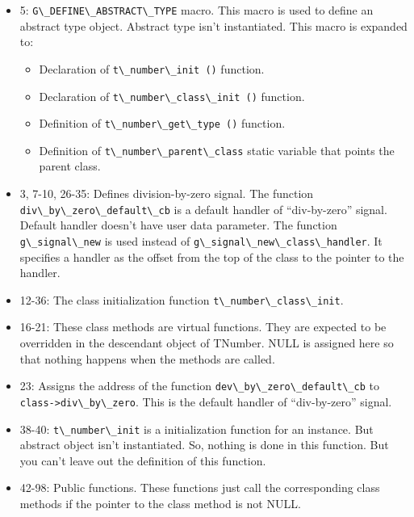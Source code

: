 \begin{itemize}
\tightlist
\item
  5: \passthrough{\lstinline!G\_DEFINE\_ABSTRACT\_TYPE!} macro. This
  macro is used to define an abstract type object. Abstract type isn't
  instantiated. This macro is expanded to:

  \begin{itemize}
  \tightlist
  \item
    Declaration of \passthrough{\lstinline!t\_number\_init ()!}
    function.
  \item
    Declaration of \passthrough{\lstinline!t\_number\_class\_init ()!}
    function.
  \item
    Definition of \passthrough{\lstinline!t\_number\_get\_type ()!}
    function.
  \item
    Definition of \passthrough{\lstinline!t\_number\_parent\_class!}
    static variable that points the parent class.
  \end{itemize}
\item
  3, 7-10, 26-35: Defines division-by-zero signal. The function
  \passthrough{\lstinline!div\_by\_zero\_default\_cb!} is a default
  handler of ``div-by-zero'' signal. Default handler doesn't have user
  data parameter. The function \passthrough{\lstinline!g\_signal\_new!}
  is used instead of
  \passthrough{\lstinline!g\_signal\_new\_class\_handler!}. It specifies
  a handler as the offset from the top of the class to the pointer to
  the handler.
\item
  12-36: The class initialization function
  \passthrough{\lstinline!t\_number\_class\_init!}.
\item
  16-21: These class methods are virtual functions. They are expected to
  be overridden in the descendant object of TNumber. NULL is assigned
  here so that nothing happens when the methods are called.
\item
  23: Assigns the address of the function
  \passthrough{\lstinline!dev\_by\_zero\_default\_cb!} to
  \passthrough{\lstinline!class->div\_by\_zero!}. This is the default
  handler of ``div-by-zero'' signal.
\item
  38-40: \passthrough{\lstinline!t\_number\_init!} is a initialization
  function for an instance. But abstract object isn't instantiated. So,
  nothing is done in this function. But you can't leave out the
  definition of this function.
\item
  42-98: Public functions. These functions just call the corresponding
  class methods if the pointer to the class method is not NULL.
\end{itemize}

